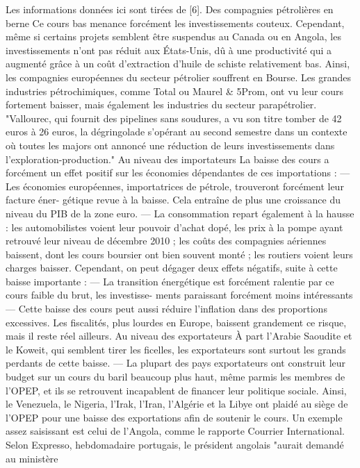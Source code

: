 Les informations données ici sont tirées de [6].
Des compagnies pétrolières en berne Ce cours bas menance forcément les investissements
couteux. Cependant, même si certains projets semblent être suspendus au Canada ou en Angola, les
investissements n’ont pas réduit aux États-Unis, dû à une productivité qui a augmenté grâce à un
coût d’extraction d’huile de schiste relativement bas. Ainsi, les compagnies européennes du secteur
pétrolier souffrent en Bourse. Les grandes industries pétrochimiques, comme Total ou Maurel &
5Prom, ont vu leur cours fortement baisser, mais également les industries du secteur parapétrolier.
"Vallourec, qui fournit des pipelines sans soudures, a vu son titre tomber de 42 euros à 26 euros,
la dégringolade s’opérant au second semestre dans un contexte où toutes les majors ont annoncé
une réduction de leurs investissements dans l’exploration-production."
Au niveau des importateurs La baisse des cours a forcément un effet positif sur les économies
dépendantes de ces importations :
— Les économies européennes, importatrices de pétrole, trouveront forcément leur facture éner-
gétique revue à la baisse. Cela entraîne de plus une croissance du niveau du PIB de la zone
euro.
— La consommation repart également à la hausse : les automobilistes voient leur pouvoir
d’achat dopé, les prix à la pompe ayant retrouvé leur niveau de décembre 2010 ; les coûts
des compagnies aériennes baissent, dont les cours boursier ont bien souvent monté ; les
routiers voient leurs charges baisser.
Cependant, on peut dégager deux effets négatifs, suite à cette baisse importante :
— La transition énergétique est forcément ralentie par ce cours faible du brut, les investisse-
ments paraissant forcément moins intéressants
— Cette baisse des cours peut aussi réduire l’inflation dans des proportions excessives. Les
fiscalités, plus lourdes en Europe, baissent grandement ce risque, mais il reste réel ailleurs.
Au niveau des exportateurs À part l’Arabie Saoudite et le Koweit, qui semblent tirer les
ficelles, les exportateurs sont surtout les grands perdants de cette baisse.
— La plupart des pays exportateurs ont construit leur budget sur un cours du baril beaucoup
plus haut, même parmis les membres de l’OPEP, et ils se retrouvent incapablent de financer
leur politique sociale. Ainsi, le Venezuela, le Nigeria, l’Irak, l’Iran, l’Algérie et la Libye ont
plaidé au siège de l’OPEP pour une baisse des exportations afin de soutenir le cours.
Un exemple assez saisissant est celui de l’Angola, comme le rapporte Courrier International.
Selon Expresso, hebdomadaire portugais, le président angolais "aurait demandé au ministère
